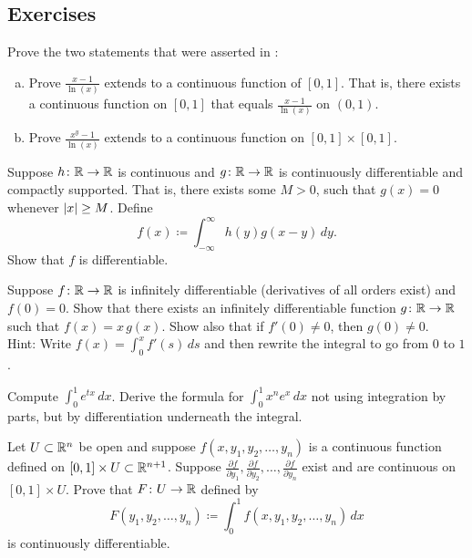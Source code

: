 \subsection{Exercises}

\begin{exercise} \label{exercise:counterexamplediffunder}
Prove the two statements that were asserted in
:
\begin{enumerate}[a)]
\item
Prove $\frac{x-1}{\ln(x)}$ extends to a continuous function of
$[0,1]$.  That is, there exists a continuous function on $[0,1]$
that equals $\frac{x-1}{\ln(x)}$ on $(0,1)$.
\item
Prove $\frac{x^y-1}{\ln(x)}$ extends to a continuous function
on $[0,1] \times [0,1]$.
\end{enumerate}
\end{exercise}

\begin{exercise}
Suppose $h \colon {\mathbb{R}} \to {\mathbb{R}}$ is continuous and $g
\colon {\mathbb{R}} \to {\mathbb{R}}$ is continuously differentiable and compactly
supported.  That is, there exists some $M > 0$, such that $g(x) = 0$ whenever
$\left\lvert {x} \right\rvert \geq M$.  Define
\begin{equation*}
f(x) \coloneqq \int_{-\infty}^\infty h(y)g(x-y)\,dy  .
\end{equation*}
Show that $f$ is differentiable.
\end{exercise}

\begin{exercise}
Suppose $f \colon {\mathbb{R}} \to {\mathbb{R}}$ is infinitely differentiable (derivatives of
all orders exist)
and $f(0) = 0$.  Show that there exists an infinitely
differentiable function $g \colon {\mathbb{R}} \to {\mathbb{R}}$ such that $f(x) = x\,g(x)$.
Show also that
if $f'(0) \not= 0$, then $g(0) \not= 0$.\\
Hint: Write
$f(x) = \int_0^x f'(s) \,ds$ and then rewrite the integral to go
from $0$ to $1$.
\end{exercise}

\begin{exercise}
Compute $\int_0^1 e^{tx} \,dx$.  Derive the formula for
$\int_0^1 x^n e^{x} \,dx$ not using integration by parts, but
by differentiation underneath the integral.
\end{exercise}

\begin{exercise}
Let $U \subset {\mathbb{R}}^n$ be open and suppose
$f(x,y_1,y_2,\ldots,y_n)$ is a continuous
function defined on $[0,1] \times U \subset {\mathbb{R}}^{n+1}$.
Suppose
$\frac{\partial f}{\partial y_1},
\frac{\partial f}{\partial y_2},\ldots,
\frac{\partial f}{\partial y_n}$
exist and are continuous on $[0,1] \times U$.
Prove that $F \colon U \to {\mathbb{R}}$ defined by
\begin{equation*}
F(y_1,y_2,\ldots,y_n) \coloneqq
\int_0^1
f(x,y_1,y_2,\ldots,y_n)
\, dx
\end{equation*}
is continuously differentiable.
\end{exercise}

